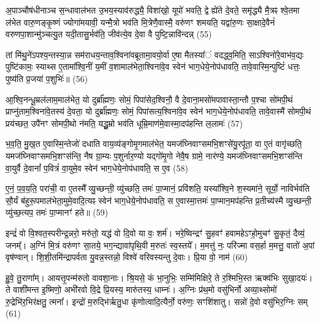 अ॒पाञ्चौष॑धीनाञ्च स॒न्धावाल॑भत उ॒भय॒स्याव॑रुद्ध्यै॒ विशा॑खो॒ यूपो॑ भवति॒ द्वे ह्ये॑ते दे॒वते॒ समृ॑द्ध्यै मै॒त्रꣴ श्वे॒तमा ल॑भेत वारु॒णङ्कृ॒ष्णं ज्योगा॑मयावी॒ यन्मै॒त्रो भव॑ति मि॒त्रेणै॒वास्मै॒ वरु॑णꣳ शमयति॒ यद्वा॑रु॒णः सा॒क्षादे॒वैनं॑ वरुण\-पा॒शान्मु॑ञ्चत्यु॒त यदी॒तासु॒र्भव॑ति॒ जीव॑त्ये॒व दे॒वा वै पुष्टि॒न्नावि॑न्दन्न् (55)

तां मि॑थु॒ने॑\-ऽपश्य॒न्तस्या॒न्न सम॑राधय॒न्ताव॒श्विना॑वब्रूतामा॒वयो॒र्वा ए॒षा मैतस्या᳚ं वदद्ध्व॒मिति॒ सा\-ऽश्विनो॑रे॒वाभ॑व॒द्यः पुष्टि॑कामः॒ स्याथ्स ए॒तामा᳚श्वि॒नीं य॒मीं व॒शामाल॑भेता॒श्विना॑वे॒व स्वेन॑ भाग॒धेये॒नोप॑धावति॒ तावे॒वास्मि॒न्पुष्टिं॑ धत्तः॒ पुष्य॑ति प्र॒जया॑ प॒शुभिः॑॥ (56)

{\anuvakamend[{अ॒न्ना॒दो᳚\-ऽन्ना॒द ए॒व भ॑वत्यविन्द॒न्पञ्च॑चत्वारिꣳशच्च।9।}]}

आ॒श्वि॒नन्धू॒म्रल॑लाम॒माल॑भेत॒ यो दुर्ब्रा᳚ह्मणः॒ सोमं॒ पिपा॑सेद॒श्विनौ॒ वै दे॒वाना॒मसो॑मपावास्ता॒न्तौ प॒श्चा सो॑मपी॒थं प्राप्नु॑ताम॒श्विना॑वे॒तस्य॑ दे॒वता॒ यो दुर्ब्रा᳚ह्मणः॒ सोमं॒ पिपा॑सत्य॒श्विना॑वे॒व स्वेन॑ भाग॒धेये॒नोप॑धावति॒ तावे॒वास्मै॑ सोमपी॒थं प्रय॑च्छत॒ उपै॑नꣳ सोमपी॒थो न॑मति॒ यद्धू॒म्रो भव॑ति धूम्रि॒माण॑मे॒वास्मा॒दप॑हन्ति ल॒लामः॑ (57)

भ॒व॒ति॒ मु॒ख॒त ए॒वास्मि॒न्तेजो॑ दधाति वाय॒व्य॑ङ्गोमृ॒गमाल॑भेत॒ यमज॑घ्निवाꣳसमभि॒शꣳसे॑यु॒रपू॑ता॒ वा ए॒तं वागृ॑च्छति॒ यमज॑घ्निवाꣳसमभि॒शꣳस॑न्ति॒ नैष ग्रा॒म्यः प॒शुर्नार॒ण्यो यद्गो॑मृ॒गो नेवै॒ष ग्रामे॒ नार॑ण्ये॒ यमज॑घ्निवाꣳसमभि॒शꣳस॑न्ति वा॒युर्वै दे॒वानां᳚ प॒वित्रं॑ वा॒युमे॒व स्वेन॑ भाग॒धेये॒नोप॑धावति॒ स ए॒व (58)

ए॒नं॒ प॒व॒य॒ति॒ परा॑ची॒ वा ए॒तस्मै᳚ व्यु॒च्छन्ती॒ व्यु॑च्छति॒ तमः॑ पा॒प्मानं॒ प्रवि॑शति॒ यस्या᳚श्वि॒ने श॒स्यमा॑ने॒ सूर्यो॒ नाविर्भव॑ति सौ॒र्यं ब॑हुरू॒पमाल॑भेता॒मुमे॒वादि॒त्यꣴ स्वेन॑ भाग॒धेये॒नोप॑धावति॒ स ए॒वास्मा॒त्तमः॑ पा॒प्मान॒मप॑हन्ति प्र॒तीच्य॑स्मै व्यु॒च्छन्ती॒ व्यु॑च्छ॒त्यप॒ तमः॑ पा॒प्मानꣳ॑ हते॥ (59)

{\anuvakamend[{ल॒लामः॒ स ए॒व षट्च॑त्वारिꣳशच्च॥10॥}]}

इन्द्रं॑ वो वि॒श्वत॒स्परीन्द्र॒न्नरो॒ मरु॑तो॒ यद्ध॑ वो दि॒वो या वः॒ शर्म॑। भरे॒ष्विन्द्रꣳ॑ सु॒हवꣳ॑ हवामहे\-ऽꣳहो॒मुचꣳ॑ सु॒कृतं॒ दैव्यं॒ जनम्᳚। अ॒ग्निं मि॒त्रं वरु॑णꣳ सा॒तये॒ भग॒न्द्यावा॑पृथि॒वी म॒रुतः॑ स्व॒स्तये᳚। म॒मत्तु॑ नः॒ परि॑ज्मा वस॒र्\mbox{}हा म॒मत्तु॒ वातो॑ अ॒पां वृष॑ण्वान्। शि॒शी॒तमि॑न्द्रापर्वता यु॒वन्न॒स्तन्नो॒ विश्वे॑ वरिवस्यन्तु दे॒वाः। प्रि॒या वो॒ नाम॑ (60)

हु॒वे॒ तु॒राणा᳚म्। आयत्तृ॒पन्म॑रुतो वावशा॒नाः। श्रि॒यसे॒ कं भा॒नुभिः॒ सम्मि॑मिक्षिरे॒ ते र॒श्मिभि॒स्त ऋक्व॑भिः सुखा॒दयः॑। ते वाशी॑मन्त इ॒ष्मिणो॒ अभी॑रवो वि॒द्रे प्रि॒यस्य॒ मारु॑तस्य॒ धाम्नः॑। अ॒ग्निः प्र॑थ॒मो वसु॑भिर्नो अव्या॒थ्सोमो॑ रु॒द्रेभि॑र॒भिर॑क्षतु॒ त्मना᳚। इन्द्रो॑ म॒रुद्भि॑र्\mbox{}ऋतु॒धा कृ॑णोत्वादि॒त्यैर्नो॒ वरु॑णः॒ सꣳशि॑शातु। सन्नो॑ दे॒वो वसु॑भिर॒ग्निः सम् (61)

